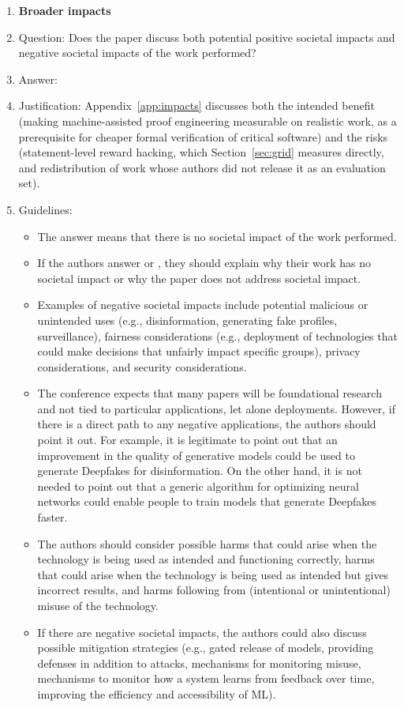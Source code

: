 \begin{enumerate}
\item {\bf Broader impacts}
    \item[] Question: Does the paper discuss both potential positive societal impacts and negative societal impacts of the work performed?
    \item[] Answer: \answerYes{}
    \item[] Justification: Appendix~\ref{app:impacts} discusses both the intended benefit (making machine-assisted proof engineering measurable on realistic work, as a prerequisite for cheaper formal verification of critical software) and the risks (statement-level reward hacking, which Section~\ref{sec:grid} measures directly, and redistribution of work whose authors did not release it as an evaluation set).
    \item[] Guidelines:
    \begin{itemize}
        \item The answer \answerNA{} means that there is no societal impact of the work performed.
        \item If the authors answer \answerNA{} or \answerNo, they should explain why their work has no societal impact or why the paper does not address societal impact.
        \item Examples of negative societal impacts include potential malicious or unintended uses (e.g., disinformation, generating fake profiles, surveillance), fairness considerations (e.g., deployment of technologies that could make decisions that unfairly impact specific groups), privacy considerations, and security considerations.
        \item The conference expects that many papers will be foundational research and not tied to particular applications, let alone deployments. However, if there is a direct path to any negative applications, the authors should point it out. For example, it is legitimate to point out that an improvement in the quality of generative models could be used to generate Deepfakes for disinformation. On the other hand, it is not needed to point out that a generic algorithm for optimizing neural networks could enable people to train models that generate Deepfakes faster.
        \item The authors should consider possible harms that could arise when the technology is being used as intended and functioning correctly, harms that could arise when the technology is being used as intended but gives incorrect results, and harms following from (intentional or unintentional) misuse of the technology.
        \item If there are negative societal impacts, the authors could also discuss possible mitigation strategies (e.g., gated release of models, providing defenses in addition to attacks, mechanisms for monitoring misuse, mechanisms to monitor how a system learns from feedback over time, improving the efficiency and accessibility of ML).
    \end{itemize}
    

\end{enumerate}
